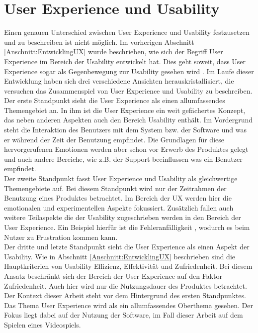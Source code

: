 \section{User Experience und Usability}
\label{Abschnitt:BegriffsdefinitionUX}
Einen genauen Unterschied zwischen User Experience und Usability festzusetzen und zu beschreiben ist nicht möglich. Im vorherigen Abschnitt \ref{Anschnitt:EntwicklingUX} wurde beschrieben, wie sich der Begriff User Experience im Bereich der Usability entwickelt hat. Dies geht soweit, dass User Experience sogar als Gegenbewegung zur Usability gesehen wird \cite[S. 91]{Hassenzahl:2011ju}. 
Im Laufe dieser Entwicklung haben sich drei verschiedene Ansichten herauskristallisiert, die versuchen das Zusammenspiel von User Experience und Usability zu beschreiben.
\\ 
Der erste Standpunkt sieht die User Experience als einen allumfassendes Themengebiet an. In ihm ist die User Experience ein weit gefächertes Konzept, das neben anderen Aspekten auch den Bereich Usability enthält. Im Vordergrund steht die Interaktion des Benutzers mit dem System bzw. der Software und was er während der Zeit der Benutzung empfindet. Die Grundlagen für diese hervorgerufenen Emotionen werden aber schon vor Erwerb des Produktes gelegt und auch andere Bereiche, wie z.B. der Support beeinflussen was ein Benutzer empfindet. \cite[S. 10f.]{Folstad:2006uh}\\
Der zweite Standpunkt fasst User Experience und Usability als gleichwertige Themengebiete auf. Bei diesem Standpunkt wird nur der Zeitrahmen der Benutzung eines Produktes betrachtet. Im Bereich der UX werden hier die emotionalen und experimentellen Aspekte fokussiert. Zusätzlich fallen auch weitere Teilaspekte die der Usability zugeschrieben werden in den Bereich der User Experience. Ein Beispiel hierfür ist die Fehleranfälligkeit \cite[S. 26]{Nielsen:1994vk}, wodurch es beim Nutzer zu Frustration kommen kann. \cite[S. 10f.]{Folstad:2006uh} \\
Der dritte und letzte Standpunkt sieht die User Experience als einen Aspekt der Usability. Wie in Abschnitt \ref{Anschnitt:EntwicklingUX} beschrieben sind die Hauptkriterien von Usability Effizienz, Effektivität und Zufriedenheit. Bei diesem Ansatz beschränkt sich der Bereich der User Experience auf den Faktor Zufriedenheit. Auch hier wird nur die Nutzungsdauer des Produktes betrachtet. \cite[S. 10f.]{Folstad:2006uh}
\\
Der Kontext dieser Arbeit steht vor dem Hintergrund des ersten Standpunktes. Das Thema User Experience wird als ein allumfassendes Oberthema gesehen. Der Fokus liegt dabei auf der Nutzung der Software, im Fall dieser Arbeit auf dem Spielen eines Videospiels. 

